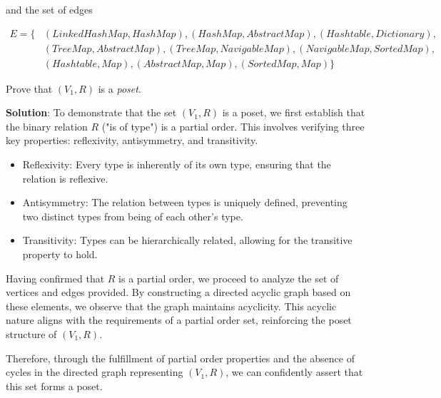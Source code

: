 \documentclass[12pt]{article}
\begin{document}
\begin{spacing}{1.5}
\begin{enumerate}
		      and the set of edges
		      		      		      
		      \begin{align*}
		      	E = \{ & (LinkedHashMap, HashMap), (HashMap, AbstractMap), (Hashtable, Dictionary),  \\
		      	       & (TreeMap, AbstractMap), (TreeMap, NavigableMap), (NavigableMap, SortedMap), \\
		      	       & (Hashtable, Map), (AbstractMap, Map), (SortedMap, Map) \}                   
		      \end{align*}
		      		      		      
		      Prove that $(V_1, R)$ is a \textit{poset}.
		      		      		      
		      \textbf{Solution}:  To demonstrate that the set $(V_1, R)$ is a poset, we first establish that the binary relation $R$ ("is of type") is a partial order. This involves verifying three key properties: reflexivity, antisymmetry, and transitivity.
		      		      
		      \begin{itemize}
		      	\item Reflexivity: Every type is inherently of its own type, ensuring that the relation is reflexive.
		      	      		      	              
		      	\item Antisymmetry: The relation between types is uniquely defined, preventing two distinct types from being of each other's type.
		      	      		      	              
		      	\item Transitivity: Types can be hierarchically related, allowing for the transitive property to hold.
		      	      		      	              
		      \end{itemize} 
		      		      
		      Having confirmed that $R$ is a partial order, we proceed to analyze the set of vertices and edges provided. By constructing a directed acyclic graph based on these elements, we observe that the graph maintains acyclicity. This acyclic nature aligns with the requirements of a partial order set, reinforcing the poset structure of $(V_1, R)$. 
		      		                  
		      Therefore, through the fulfillment of partial order properties and the absence of cycles in the directed graph representing $(V_1, R)$, we can confidently assert that this set forms a poset.       
		      		      		              

\end{enumerate}
\end{spacing}
\end{document}
